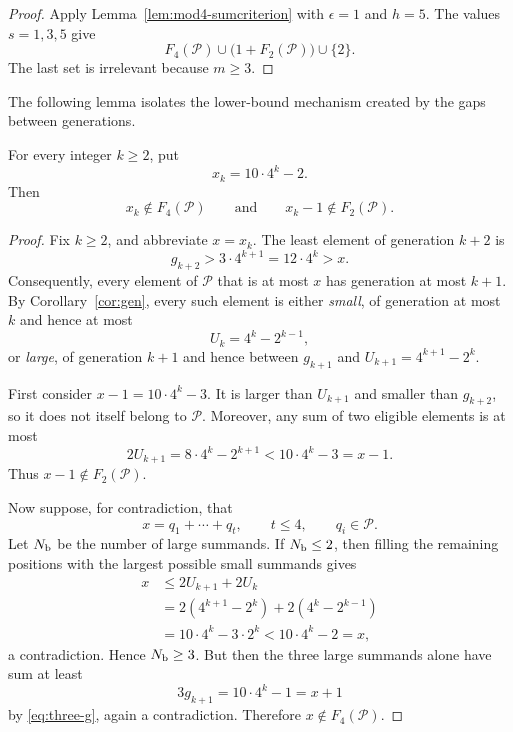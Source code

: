 \documentclass{ws-ijfcs}
\newcommand{\Pset}{\mathcal P}
\begin{document}
\begin{proof}
Apply Lemma~\ref{lem:mod4-sumcriterion} with $\epsilon=1$ and $h=5$.
The values $s=1,3,5$ give
\[
 F_4(\Pset)\cup\bigl(1+F_2(\Pset)\bigr)\cup\{2\}.
\]
The last set is irrelevant because $m\geq3$.
\end{proof}

The following lemma isolates the lower-bound mechanism created by the
gaps between generations.

\newpage
\begin{lemma}\label{lem:obstruction}
For every integer $k\geq2$, put
\[
 x_k=10\cdot4^k-2.
\]
Then
\begin{equation}\label{eq:obstruction}
 x_k\notin F_4(\Pset)
 \qquad\text{and}\qquad
 x_k-1\notin F_2(\Pset).
\end{equation}
\end{lemma}

\begin{proof}
Fix $k\geq2$, and abbreviate $x=x_k$.  The least element of generation
$k+2$ is
\[
 g_{k+2}>3\cdot4^{k+1}=12\cdot4^k>x.
\]
Consequently, every element of $\Pset$ that is at most $x$ has generation
at most $k+1$.  By Corollary~\ref{cor:gen}, every such element is either
\emph{small}, of generation at most $k$ and hence at most
\[
 U_k=4^k-2^{k-1},
\]
or \emph{large}, of generation $k+1$ and hence between $g_{k+1}$ and
$U_{k+1}=4^{k+1}-2^k$.

First consider $x-1=10\cdot4^k-3$.  It is larger than $U_{k+1}$ and
smaller than $g_{k+2}$, so it does not itself belong to $\Pset$.
Moreover, any sum of two eligible elements is at most
\[
 2U_{k+1}=8\cdot4^k-2^{k+1}<10\cdot4^k-3=x-1.
\]
Thus $x-1\notin F_2(\Pset)$.

Now suppose, for contradiction, that
\[
 x=q_1+\cdots+q_t,
 \qquad t\leq4,
 \qquad q_i\in\Pset.
\]
Let $N_{\rm b}$ be the number of large summands.  If $N_{\rm b}\leq2$,
then filling the remaining positions with the largest possible small
summands gives
\begin{align*}
 x
 &\leq2U_{k+1}+2U_k\\
 &=2(4^{k+1}-2^k)+2(4^k-2^{k-1})\\
 &=10\cdot4^k-3\cdot2^k
 <10\cdot4^k-2=x,
\end{align*}
a contradiction.  Hence $N_{\rm b}\geq3$.  But then the three large
summands alone have sum at least
\[
 3g_{k+1}=10\cdot4^k-1=x+1
\]
by \eqref{eq:three-g}, again a contradiction.  Therefore
$x\notin F_4(\Pset)$.
\end{proof}
\end{document}
